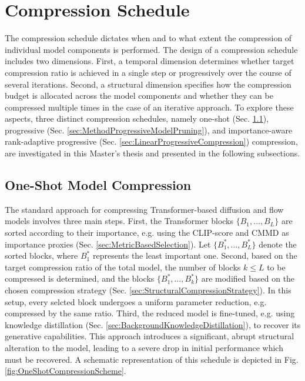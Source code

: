 \section{Compression Schedule}
\label{sec:MethodPruningSchedule}
The compression schedule dictates when and to what extent the compression of individual model components is performed. The design of a compression schedule includes two dimensions. First, a temporal dimension determines whether target compression ratio is achieved in a single step or progressively over the course of several iterations. Second, a structural dimension specifies how the compression budget is allocated across the model components and whether they can be compressed multiple times in the case of an iterative approach. To explore these aspects,
three distinct compression schedules, namely one-shot (Sec. \ref{sec:MethodOneShotPruning}), progressive (Sec. \ref{sec:MethodProgressiveModelPruning}), and importance-aware rank-adaptive progressive (Sec. \ref{sec:LinearProgressiveCompression}) compression, are investigated in this Master's thesis and presented in the following subsections.

\subsection{One-Shot Model Compression}
\label{sec:MethodOneShotPruning}
The standard approach for compressing Transformer-based diffusion and flow models \cite{Laptop, Koala, flux1-lite, flux_mini_2024} involves three main steps. First, the Transformer blocks $\{B_1, \dots, B_L\}$ are sorted according to their importance, e.g. using the \gls{CLIP}-score and \gls{CMMD} as importance proxies (Sec. \ref{sec:MetricBasedSelection}). Let $\{B^*_1, \dots, B^*_L\}$ denote the sorted blocks, where $B^*_1$ represents the least important one. Second, based on the target compression ratio of the total model, the number of blocks $k \leq L$ to be compressed is determined, and the blocks $\{B^*_1, \dots, B^*_k\}$ are modified based on the chosen compression strategy (Sec. \ref{sec:StructuralCompressionStrategy}). In this setup, every selcted block undergoes a uniform parameter reduction, e.g. compressed by the same ratio. Third, the reduced model is fine-tuned, e.g. using knowledge distillation (Sec. \ref{sec:BackgroundKnowledgeDistillation}), to recover its generative capabilities. This approach introduces a significant, abrupt structural alteration to the model, leading to a severe drop in initial performance which must be recovered. A schematic representation of this schedule is depicted in Fig. \ref{fig:OneShotCompressionScheme}.


